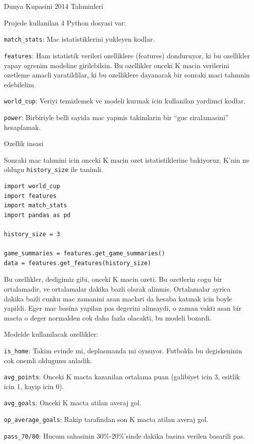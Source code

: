 \documentclass[12pt,fleqn]{article}\usepackage{../common}
\begin{document}
Dunya Kupasini 2014 Tahminleri

Projede kullanilan 4 Python dosyasi var: 

\verb!match_stats!: Mac istatistiklerini yukleyen kodlar.

\verb!features!: Ham istatistik verileri ozelliklere (features) donduruyor,
ki bu ozellikler yapay ogrenim modeline girilebilsin. Bu ozellikler onceki
K macin verilerini ozetleme amacli yaratildilar, ki bu ozelliklere
dayanarak bir sonraki maci tahmnin edebilelim.

\verb!world_cup!: Veriyi temizlemek ve modeli kurmak icin kullanilan
yardimci kodlar.

\verb!power!: Birbiriyle belli sayida mac yapmis takimlarin bir ``guc
siralamasini'' hesaplamak. 

Ozellik insasi

Sonraki mac tahmini icin onceki K macin ozet istatistiklerine bakiyoruz, K'nin
ne oldugu \verb!history_size! ile tanimli.

\begin{verbatim}
import world_cup
import features
import match_stats
import pandas as pd

history_size = 3

game_summaries = features.get_game_summaries()
data = features.get_features(history_size)
\end{verbatim}

Bu ozellikler, dedigimiz gibi, onceki K macin ozeti. Bu ozetlerin cogu bir
ortalamadir, ve ortalamalar dakika bazli olarak alinmis. Ortalamalar ayrica
dakika bazli cunku mac zamanini asan maclari da hesaba katmak icin boyle
yapildi. Eger mac basina yapilan pas degerini alinsaydi, o zaman vakti asan
bir macta o deger normalden cok daha fazla olacakti, bu modeli bozardi.

Modelde kullanilacak ozellikler:

\verb!is_home!: Takim evinde mi, deplasmanda mi oynuyor. Futbolda bu
degiskeninin cok onemli oldugunu anladik.

\verb!avg_points!: Onceki K macta kazanilan ortalama puan (galibiyet icin
3, esitlik icin 1, kayip icin 0). 

\verb!avg_goals!: Onceki K macta atilan averaj gol.

\verb!op_average_goals!: Rakip tarafindan son K macta atilan averaj gol.

\verb!pass_70/80!: Hucum sahasinin 30\%-20\%'sinde dakika basina verilen
basarili pas.
\end{document}
